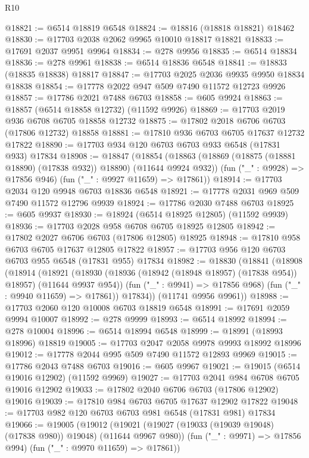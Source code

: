 \begin{lexlean}{R10}
\begin{coremodule}
@18821 := @6514 @18819 @6548
@18824 := @18816 (@18818 @18821) @18462
@18830 := @17703 @2038 @2062 @9965 @10010 @18817 @18821
@18833 := @17691 @2037 @9951 @9964
@18834 := @278 @9956
@18835 := @6514 @18834
@18836 := @278 @9961
@18838 := @6514 @18836 @6548
@18841 := @18833 (@18835 @18838) @18817
@18847 := @17703 @2025 @2036 @9935 @9950 @18834 @18838
@18854 := @17778 @2022 @947 @509 @7490 @11572 @12723 @9926
@18857 := @17786 @2021 @7488 @6703
@18858 := @605 @9924
@18863 := @18857 (@6514 @18858 @12732) (@11592 @9926)
@18869 := @17703 @2019 @936 @6708 @6705 @18858 @12732
@18875 := @17802 @2018 @6706 @6703 (@17806 @12732) @18858
@18881 := @17810 @936 @6703 @6705 @17637 @12732 @17822
@18890 := @17703 @934 @120 @6703 @6703 @933 @6548 (@17831 @933) @17834
@18908 := @18847
    (@18854
      (@18863 (@18869 (@18875 (@18881 @18890) (@17838 @932)) @18890) (@11644 @9924 @932))
      (fun ("_" : @9928) => @17856 @946)
      (fun ("_" : @9927 @11659) => @17861))
@18914 := @17703 @2034 @120 @9948 @6703 @18836 @6548
@18921 := @17778 @2031 @969 @509 @7490 @11572 @12796 @9939
@18924 := @17786 @2030 @7488 @6703
@18925 := @605 @9937
@18930 := @18924 (@6514 @18925 @12805) (@11592 @9939)
@18936 := @17703 @2028 @958 @6708 @6705 @18925 @12805
@18942 := @17802 @2027 @6706 @6703 (@17806 @12805) @18925
@18948 := @17810 @958 @6703 @6705 @17637 @12805 @17822
@18957 := @17703 @956 @120 @6703 @6703 @955 @6548 (@17831 @955) @17834
@18982 := @18830
    (@18841
      (@18908
        (@18914
          (@18921
            (@18930 (@18936 (@18942 (@18948 @18957) (@17838 @954)) @18957) (@11644 @9937 @954))
            (fun ("_" : @9941) => @17856 @968)
            (fun ("_" : @9940 @11659) => @17861))
          @17834))
      (@11741 @9956 @9961))
@18988 := @17703 @2060 @120 @10008 @6703 @18819 @6548
@18991 := @17691 @2059 @9994 @10007
@18992 := @278 @9999
@18993 := @6514 @18992
@18994 := @278 @10004
@18996 := @6514 @18994 @6548
@18999 := @18991 (@18993 @18996) @18819
@19005 := @17703 @2047 @2058 @9978 @9993 @18992 @18996
@19012 := @17778 @2044 @995 @509 @7490 @11572 @12893 @9969
@19015 := @17786 @2043 @7488 @6703
@19016 := @605 @9967
@19021 := @19015 (@6514 @19016 @12902) (@11592 @9969)
@19027 := @17703 @2041 @984 @6708 @6705 @19016 @12902
@19033 := @17802 @2040 @6706 @6703 (@17806 @12902) @19016
@19039 := @17810 @984 @6703 @6705 @17637 @12902 @17822
@19048 := @17703 @982 @120 @6703 @6703 @981 @6548 (@17831 @981) @17834
@19066 := @19005
    (@19012
      (@19021 (@19027 (@19033 (@19039 @19048) (@17838 @980)) @19048) (@11644 @9967 @980))
      (fun ("_" : @9971) => @17856 @994)
      (fun ("_" : @9970 @11659) => @17861))

\end{coremodule}
\end{lexlean}
